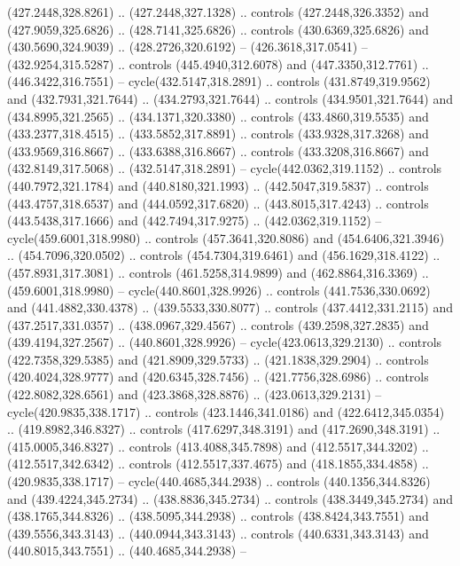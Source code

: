 \begin{scope}[cm={{1.25,0.0,0.0,-1.25,(0.0,743.43331)}}]
    (427.2448,328.8261) .. (427.2448,327.1328) .. controls (427.2448,326.3352) and
    (427.9059,325.6826) .. (428.7141,325.6826) .. controls (430.6369,325.6826) and
    (430.5690,324.9039) .. (428.2726,320.6192) -- (426.3618,317.0541) --
    (432.9254,315.5287) .. controls (445.4940,312.6078) and (447.3350,312.7761) ..
    (446.3422,316.7551) -- cycle(432.5147,318.2891) .. controls
    (431.8749,319.9562) and (432.7931,321.7644) .. (434.2793,321.7644) .. controls
    (434.9501,321.7644) and (434.8995,321.2565) .. (434.1371,320.3380) .. controls
    (433.4860,319.5535) and (433.2377,318.4515) .. (433.5852,317.8891) .. controls
    (433.9328,317.3268) and (433.9569,316.8667) .. (433.6388,316.8667) .. controls
    (433.3208,316.8667) and (432.8149,317.5068) .. (432.5147,318.2891) --
    cycle(442.0362,319.1152) .. controls (440.7972,321.1784) and
    (440.8180,321.1993) .. (442.5047,319.5837) .. controls (443.4757,318.6537) and
    (444.0592,317.6820) .. (443.8015,317.4243) .. controls (443.5438,317.1666) and
    (442.7494,317.9275) .. (442.0362,319.1152) -- cycle(459.6001,318.9980) ..
    controls (457.3641,320.8086) and (454.6406,321.3946) .. (454.7096,320.0502) ..
    controls (454.7304,319.6461) and (456.1629,318.4122) .. (457.8931,317.3081) ..
    controls (461.5258,314.9899) and (462.8864,316.3369) .. (459.6001,318.9980) --
    cycle(440.8601,328.9926) .. controls (441.7536,330.0692) and
    (441.4882,330.4378) .. (439.5533,330.8077) .. controls (437.4412,331.2115) and
    (437.2517,331.0357) .. (438.0967,329.4567) .. controls (439.2598,327.2835) and
    (439.4194,327.2567) .. (440.8601,328.9926) -- cycle(423.0613,329.2130) ..
    controls (422.7358,329.5385) and (421.8909,329.5733) .. (421.1838,329.2904) ..
    controls (420.4024,328.9777) and (420.6345,328.7456) .. (421.7756,328.6986) ..
    controls (422.8082,328.6561) and (423.3868,328.8876) .. (423.0613,329.2131) --
    cycle(420.9835,338.1717) .. controls (423.1446,341.0186) and
    (422.6412,345.0354) .. (419.8982,346.8327) .. controls (417.6297,348.3191) and
    (417.2690,348.3191) .. (415.0005,346.8327) .. controls (413.4088,345.7898) and
    (412.5517,344.3202) .. (412.5517,342.6342) .. controls (412.5517,337.4675) and
    (418.1855,334.4858) .. (420.9835,338.1717) -- cycle(440.4685,344.2938) ..
    controls (440.1356,344.8326) and (439.4224,345.2734) .. (438.8836,345.2734) ..
    controls (438.3449,345.2734) and (438.1765,344.8326) .. (438.5095,344.2938) ..
    controls (438.8424,343.7551) and (439.5556,343.3143) .. (440.0944,343.3143) ..
    controls (440.6331,343.3143) and (440.8015,343.7551) .. (440.4685,344.2938) --

\end{scope}
